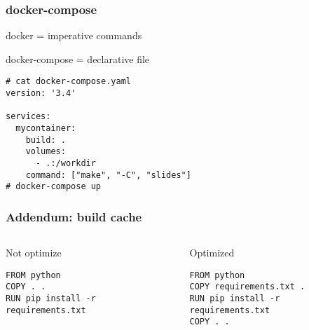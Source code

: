 \documentclass{beamer}
\begin{document}
\begin{frame}[fragile]
    \frametitle{docker-compose}

    docker = imperative commands

    docker-compose = declarative file

    \vfill
    \begin{verbatim}
# cat docker-compose.yaml
version: '3.4'

services:
  mycontainer:
    build: .
    volumes:
      - .:/workdir
    command: ["make", "-C", "slides"]
# docker-compose up
    \end{verbatim}
\end{frame}

\begin{frame}[fragile]
    \frametitle{Addendum: build cache}

    \begin{columns}
    \begin{column}{0.48\textwidth}
        \begin{alertblock}{Not optimize}
        \begin{verbatim}
FROM python
COPY . .
RUN pip install -r requirements.txt
        \end{verbatim}
        \end{alertblock}
    \end{column}
    \begin{column}{0.48\textwidth}
        \begin{exampleblock}{Optimized}
        \begin{verbatim}
FROM python
COPY requirements.txt .
RUN pip install -r requirements.txt
COPY . .
        \end{verbatim}
        \end{exampleblock}
    \end{column}
    \end{columns}

\end{frame}
\end{document}
